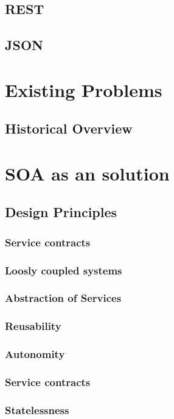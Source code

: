 \documentclass[10pt]{article}
\begin{document}
\subsection{REST}
\subsection{JSON}



\section{Existing Problems}
\subsection{Historical Overview}

\section{SOA as an solution} 
\subsection{Design Principles}
\label{sec:dp}
\subsubsection{Service contracts}

\subsubsection{Loosly coupled systems}
\subsubsection{Abstraction of Services}
\subsubsection{Reusability}
\subsubsection{Autonomity}
\subsubsection{Service contracts}
\subsubsection{Statelessness}
\end{document}
